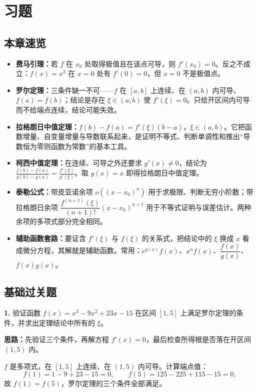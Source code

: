 \section{习题}

\subsection{本章速览}

\begin{itemize}
\item \textbf{费马引理：}若 $f$ 在 $x_0$ 处取得极值且在该点可导，则 $f'(x_0)=0$。反之不成立：$f(x)=x^3$ 在 $x=0$ 处有 $f'(0)=0$，但 $x=0$ 不是极值点。
\item \textbf{罗尔定理：}三条件缺一不可——$f$ 在 $[a,b]$ 上连续、在 $(a,b)$ 内可导、$f(a)=f(b)$；结论是存在 $\xi\in(a,b)$ 使 $f'(\xi)=0$。只给开区间内可导而不给端点连续，结论可能失效。
\item \textbf{拉格朗日中值定理：}$f(b)-f(a)=f'(\xi)(b-a)$，$\xi\in(a,b)$。它把函数增量、自变量增量与导数联系起来，是证明不等式、判断单调性和推出“导数恒为零则函数为常数”的基本工具。
\item \textbf{柯西中值定理：}在连续、可导之外还要求 $g'(x)\neq 0$，结论为 $\frac{f(b)-f(a)}{g(b)-g(a)}=\frac{f'(\xi)}{g'(\xi)}$。取 $g(x)=x$ 即得拉格朗日中值定理。
\item \textbf{泰勒公式：}带皮亚诺余项 $o((x-x_0)^n)$ 用于求极限、判断无穷小阶数；带拉格朗日余项 $\dfrac{f^{(n+1)}(\xi)}{(n+1)!}(x-x_0)^{n+1}$ 用于不等式证明与误差估计。两种余项的多项式部分完全相同。
\item \textbf{辅助函数套路：}要证含 $f'(\xi)$ 与 $f(\xi)$ 的关系式，把结论中的 $\xi$ 换成 $x$ 看成微分方程，其解就是辅助函数。常用：$e^{g(x)}f(x)$、$x^nf(x)$、$\dfrac{f(x)}{g(x)}$、$f(x)g(x)$。
\end{itemize}

\subsection{基础过关题}

\textbf{1.} 验证函数 $f(x)=x^{3}-9x^{2}+23x-15$ 在区间 $[1,5]$ 上满足罗尔定理的条件，并求出定理结论中所有的 $\xi$。

\ifshowsolutions%
\textbf{思路：}先验证三个条件，再解方程 $f'(x)=0$，最后检查所得根是否落在开区间 $(1,5)$ 内。

$f$ 是多项式，在 $[1,5]$ 上连续、在 $(1,5)$ 内可导。计算端点值：
\[
f(1)=1-9+23-15=0,\qquad f(5)=125-225+115-15=0,
\]
故 $f(1)=f(5)$，罗尔定理的三个条件全部满足。

